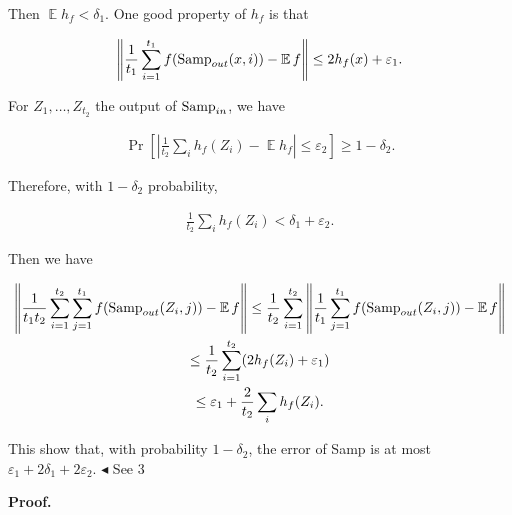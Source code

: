 \documentclass[10pt,a4paper]{article}
\begin{document}
Then $\operatorname*{\mathbb{E}}h_{f}<\delta_{1}$. One good property of $h_{f}$ is that\par


\[\begin{gathered}
\left\lVert\frac{1}{t_{1}}\sum_{i=1}^{t_{1}}f(\textup{{Samp}}_{out}(x,i))-\operatorname*{\mathbb{E}}f\right\rVert\leq 2h_{f}(x)+\varepsilon_{1}.
\end{gathered}\]


For $Z_{1},\dots,Z_{t_{2}}$ the output of $\textup{{Samp}}_{in}$, we have\par


\[\begin{gathered}
\Pr\left[\left|\frac{1}{t_{2}}\sum_{i}h_{f}(Z_{i})-\operatorname*{\mathbb{E}}h_{f}\right|\leq\varepsilon_{2}\right]\geq 1-\delta_{2}.
\end{gathered}\]


Therefore, with $1-\delta_{2}$ probability,\par


\[\begin{gathered}
{\frac{1}{t_{2}}\sum_{i}h_{f}(Z_{i})}<\delta_{1}+\varepsilon_{2}.
\end{gathered}\]


Then we have\par


\[\begin{gathered}
\displaystyle\left\lVert\frac{1}{t_{1}t_{2}}\sum_{i=1}^{t_{2}}\sum_{j=1}^{t_{1}}f(\textup{{Samp}}_{out}(Z_{i},j))-\operatorname*{\mathbb{E}}f\right\rVert \displaystyle\leq\frac{1}{t_{2}}\sum_{i=1}^{t_{2}}\left\lVert\frac{1}{t_{1}}\sum_{j=1}^{t_{1}}f(\textup{{Samp}}_{out}(Z_{i},j))-\operatorname*{\mathbb{E}}f\right\rVert \\
\displaystyle\leq\frac{1}{t_{2}}\sum_{i=1}^{t_{2}}(2h_{f}(Z_{i})+\varepsilon_{1}) \\
\displaystyle\leq\varepsilon_{1}+{\frac{2}{t_{2}}\sum_{i}h_{f}(Z_{i})}.
\end{gathered}\]


This show that, with probability $1-\delta_{2}$, the error of Samp is at most $\varepsilon_{1}+2\delta_{1}+2\varepsilon_{2}$.
$\blacktriangleleft$
See 3\par





\par\medskip\noindent\textbf{Proof.}\par
\end{document}

